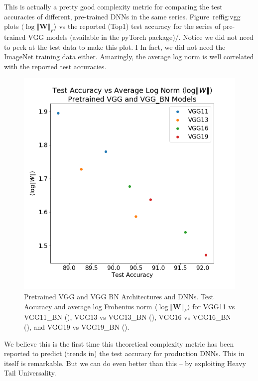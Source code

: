 This is actually a pretty good complexity metric for comparing the test accuracies of different, pre-trained DNNs in the same series.
Figure~ref{fig:vgg} plots $\langle\log\Vert\mathbf{W}\Vert_{F}\rangle$ vs the reported (Top1) test accuracy for the series of pre-trained
VGG models (available in the pyTorch package\cite{pyTorch})/.  Notice we did not need to peek at the test data to make this plot.  I
In fact, we did not need the ImageNet training data either.  Amazingly, the average log norm is well correlated with the reported test accuracies.

\begin{figure}[!htb]
 \centering
   \includegraphics[scale=0.40]{img/vgg-lognorms.png}
   \caption{
Pretrained VGG and VGG BN Architectures and DNNs.  Test Accuracy and average log Frobenius norm $\langle\log\Vert\mathbf{W}\Vert_{F}\rangle$ for
 VGG11 vs VGG11\_BN ({\color{blue}{blue}}),
VGG13 vs VGG13\_BN ({\color{orange}{orange}}),
VGG16 vs VGG16\_BN ({\color{green}{green}}),  and
VGG19 vs VGG19\_BN ({\color{red}{red}}). 
}
  \label{fig:vgg}
\end{figure}

We believe this is the first time this theoretical complexity metric has been reported to predict (trends in) the test accuracy for production
DNNs.  This in itself is remarkable.  But we can do even better than this -- by exploiting Heavy Tail Universality.

